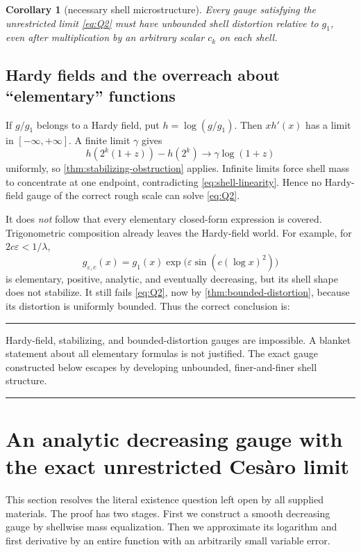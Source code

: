 \documentclass[11pt,oneside]{article}
\newtheorem{corollary}[theorem]{Corollary}
\theoremstyle{definition}
\theoremstyle{remark}
\newenvironment{boxedremark}{%
  \par\smallskip\noindent\begin{center}\begin{minipage}{0.94\textwidth}%
  \color{black}\hrule\vspace{0.6em}\small
}{%
  \vspace{0.6em}\hrule\end{minipage}\end{center}\smallskip
}
\begin{document}
\begin{corollary}[necessary shell microstructure]
\label{cor:necessary-microstructure}
Every gauge satisfying the unrestricted limit \eqref{eq:Q2} must have
unbounded shell distortion relative to \(g_1\), even after multiplication by
an arbitrary scalar \(c_k\) on each shell.
\end{corollary}

\subsection{Hardy fields and the overreach about ``elementary'' functions}

If \(g/g_1\) belongs to a Hardy field, put
\(h=\log(g/g_1)\).  Then \(xh'(x)\) has a limit in
\([ -\infty,+\infty]\).  A finite limit \(\gamma\) gives
\[
 h(2^k(1+z))-h(2^k)\longrightarrow\gamma\log(1+z)
\]
uniformly, so \cref{thm:stabilizing-obstruction} applies.  Infinite limits
force shell mass to concentrate at one endpoint, contradicting
\eqref{eq:shell-linearity}.  Hence no Hardy-field gauge of the correct rough
scale can solve \eqref{eq:Q2}.

It does \emph{not} follow that every elementary closed-form expression is
covered.  Trigonometric composition already leaves the Hardy-field world.
For example, for \(2c\varepsilon<1/\lambda\),
\begin{equation}
 g_{\varepsilon,c}(x)
 =g_1(x)\exp\!\bigl(\varepsilon\sin(c(\log x)^2)\bigr)
 \label{eq:oscillatory-elementary}
\end{equation}
is elementary, positive, analytic, and eventually decreasing, but its shell
shape does not stabilize.  It still fails \eqref{eq:Q2}, now by
\cref{thm:bounded-distortion}, because its distortion is uniformly bounded.
Thus the correct conclusion is:

\begin{boxedremark}
Hardy-field, stabilizing, and bounded-distortion gauges are impossible.  A
blanket statement about all elementary formulas is not justified.  The exact
gauge constructed below escapes by developing unbounded, finer-and-finer shell
structure.
\end{boxedremark}

\section{An analytic decreasing gauge with the exact unrestricted Ces\`aro limit}
\label{sec:adaptive}

This section resolves the literal existence question left open by all supplied
materials.  The proof has two stages.  First we construct a smooth decreasing
gauge by shellwise mass equalization.  Then we approximate its logarithm and
first derivative by an entire function with an arbitrarily small variable
error.
\end{document}
